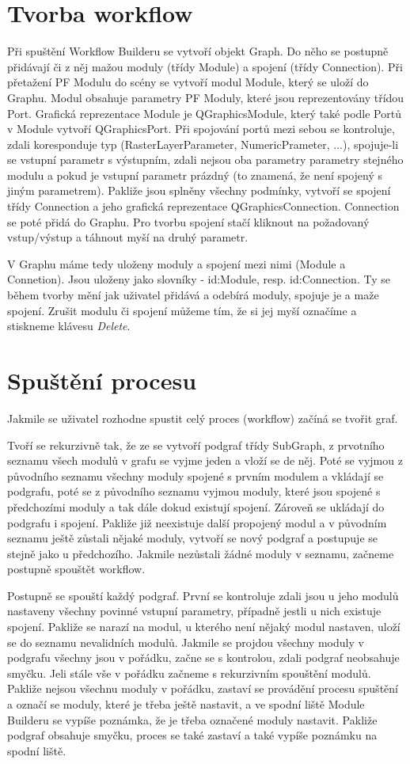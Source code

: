 \section{Tvorba workflow}
Při spuštění Workflow Builderu se vytvoří objekt Graph. Do něho se postupně přidávají či z něj mažou moduly (třídy Module) a spojení (třídy Connection). Při přetažení PF Modulu do scény se vytvoří modul Module, který se uloží do Graphu. Modul obsahuje parametry PF Moduly, které jsou reprezentovány třídou Port. Grafická reprezentace Module je QGraphicsModule, který také podle Portů v Module vytvoří QGraphicsPort. Při spojování portů mezi sebou se kontroluje, zdali koresponduje typ (RasterLayerParameter, NumericPrameter, ...), spojuje-li se vstupní parametr s výstupním, zdali nejsou oba parametry parametry stejného modulu a pokud je vstupní parametr prázdný (to znamená, že není spojený s jiným parametrem). Pakliže jsou splněny všechny podmínky, vytvoří se spojení třídy Connection a jeho grafická reprezentace QGraphicsConnection. Connection se poté přidá do Graphu. Pro tvorbu spojení stačí kliknout na požadovaný vstup/výstup a táhnout myší na druhý parametr.

V Graphu máme tedy uloženy moduly a spojení mezi nimi (Module a Connetion). Jsou uloženy jako slovníky - id:Module, resp. id:Connection. Ty se během tvorby mění jak uživatel přidává a odebírá moduly, spojuje je a maže spojení. Zrušit modulu či spojení můžeme tím, že si jej myší označíme a stiskneme klávesu \textit{Delete}. 

\section{Spuštění procesu}
Jakmile se uživatel rozhodne spustit celý proces (workflow) začíná se tvořit graf. 

Tvoří se rekurzivně tak, že ze se vytvoří podgraf třídy SubGraph, z prvotního seznamu všech modulů v grafu se vyjme jeden a vloží se de něj. Poté se vyjmou z původního seznamu všechny moduly spojené s prvním modulem a vkládají se podgrafu, poté se z původního seznamu vyjmou moduly, které jsou spojené s předchozími moduly a tak dále dokud existují spojení. Zároveň se ukládají do podgrafu i spojení. Pakliže již neexistuje další propojený modul a v původním seznamu ještě zůstali nějaké moduly, vytvoří se nový podgraf a postupuje se stejně jako u předchozího. Jakmile nezůstali žádné moduly v seznamu, začneme postupně spouštět workflow.

Postupně se spouští každý podgraf. První se kontroluje zdali jsou u jeho modulů nastaveny všechny povinné vstupní parametry, případně jestli u nich existuje spojení. Pakliže se narazí na modul, u kterého není nějaký modul nastaven, uloží se do seznamu nevalidních modulů. Jakmile se projdou všechny moduly v podgrafu všechny jsou v pořádku, začne se s {\color{red} kontrolou, zdali podgraf neobsahuje smyčku}. Jeli stále vše v pořádku začneme s rekurzivním spouštění modulů. Pakliže nejsou všechnu moduly v pořádku, zastaví se provádění procesu spuštění a označí se moduly, které je třeba ještě nastavit, a ve spodní liště Module Builderu se vypíše poznámka, že je třeba označené moduly nastavit. Pakliže podgraf obsahuje smyčku, proces se také zastaví a také vypíše poznámku na spodní liště.

